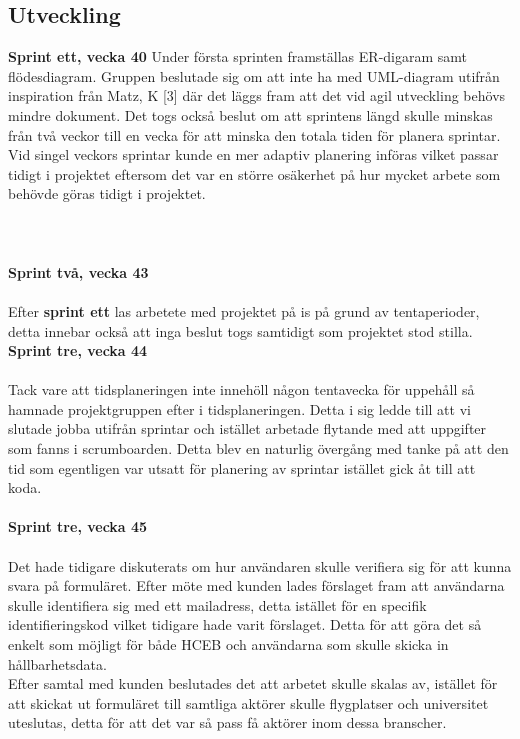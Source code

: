 \documentclass[12pt]{article}
\begin{document}
\subsection{Utveckling}
\textbf{Sprint ett, vecka 40}
Under första sprinten framställas ER-digaram samt flödesdiagram. Gruppen beslutade sig om att inte ha med UML-diagram utifrån inspiration från Matz, K [3] där det läggs fram att det vid agil utveckling behövs mindre dokument. 
Det togs också beslut om att sprintens längd skulle minskas från två veckor till en vecka för att minska den totala tiden för planera sprintar. Vid singel veckors sprintar kunde en mer adaptiv planering införas vilket passar tidigt i projektet eftersom det var en större osäkerhet på hur mycket arbete som behövde göras tidigt i projektet. \\\\
\\\\\textbf{Sprint två, vecka 43}\\\\
Efter \textbf{sprint ett} las arbetete med projektet på is på grund av tentaperioder, detta innebar också att inga beslut togs samtidigt som projektet stod stilla.
\textbf{Sprint tre, vecka 44}\\\\
Tack vare att tidsplaneringen inte innehöll någon tentavecka för uppehåll så hamnade projektgruppen efter i tidsplaneringen. Detta i sig ledde till att vi slutade jobba utifrån sprintar och istället arbetade flytande med att uppgifter som fanns i scrumboarden. Detta blev en naturlig övergång med tanke på att den tid som egentligen var utsatt för planering av sprintar istället gick åt till att koda. \\\\
\textbf{Sprint tre, vecka 45} \\\\
Det hade tidigare diskuterats om hur användaren skulle verifiera sig för att kunna svara på formuläret. Efter möte med kunden lades förslaget fram att användarna skulle identifiera sig med ett mailadress, detta istället för en specifik identifieringskod vilket tidigare hade varit förslaget. Detta för att göra det så enkelt som möjligt för både HCEB och användarna som skulle skicka in hållbarhetsdata.\\
Efter samtal med kunden beslutades det att arbetet skulle skalas av, istället för att skickat ut formuläret till samtliga aktörer skulle flygplatser och universitet uteslutas, detta för att det var så pass få aktörer inom dessa branscher.
\end{document}
